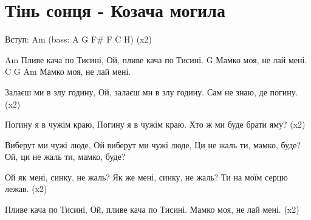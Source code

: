 ﻿\section{Тінь сонця - Козача могила}
\begin{guitar}

Вступ: Am (bass: A G F# F C H)  (x2)

Am
   Пливе кача по Тисині,
   Ой, пливе кача по Тисині.
                      G
   Мамко моя, не лай мені.
    C      G   Am
   Мамко моя, не лай мені.

Залаєш ми в злу годину,
Ой, залаєш ми в злу годину.
Сам не знаю, де погину.   (x2)

Погину я в чужім краю,
Погину я в чужім краю.
Хто ж ми буде брати яму?  (x2)

Виберут ми чужі люде,
Ой виберут ми чужі люде,
Ци не жаль ти, мамко, буде?
Ой, ци не жаль ти, мамко, буде?

Ой як мені, синку, не жаль?
Як же мені, синку, не жаль?
Ти на моїм серцю лежав.   (x2)

Пливе кача по Тисині,
Ой, пливе кача по Тисині.
Мамко моя, не лай мені.   (x2)
\end{guitar}